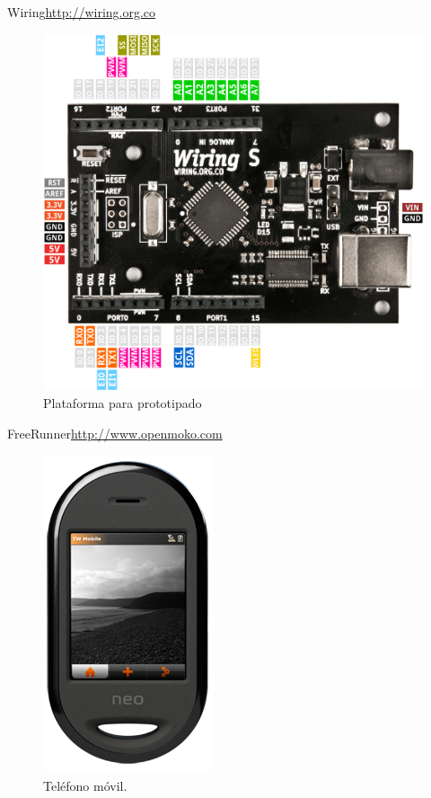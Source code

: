 \documentclass{beamer}
\begin{document}
\begin{frame}{Wiring}{\url{http://wiring.org.co}}
  \begin{figure}
    \centering
    \includegraphics[scale=0.3]{img/wiring}
    \caption{Plataforma para prototipado}
    \label{fig:wiring}
  \end{figure}
\end{frame}

\begin{frame}{FreeRunner}{\url{http://www.openmoko.com}}
  \begin{figure}
    \includegraphics[scale=0.65]{img/freerunner_shop1}
    \caption{Teléfono móvil.}
    \label{fig:openmoko}
  \end{figure}
\end{frame}
\end{document}
